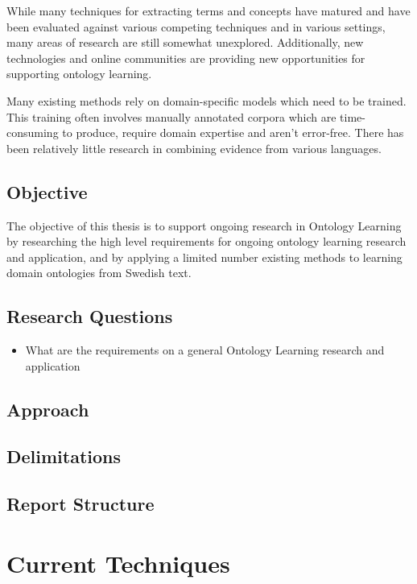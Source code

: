 \documentclass[a4paper]{report}
\begin{document}
While many techniques for extracting terms and concepts have matured and have been evaluated against various competing techniques and in various settings, many areas of research are still somewhat unexplored.
Additionally, new technologies and online communities are providing new opportunities for supporting ontology learning.

Many existing methods rely on domain-specific models which need to be trained.
This training often involves manually annotated corpora which are time-consuming to produce, require domain expertise and aren't error-free.
There has been relatively little research in combining evidence from various languages.

\section{Objective}

The objective of this thesis is to support ongoing research in Ontology Learning by researching the high level requirements for ongoing ontology learning research and application, and by applying a limited number existing methods to learning domain ontologies from Swedish text.
\cite{expand and clarify}

\section{Research Questions}

\begin{itemize}
  \item{What are the requirements on a general Ontology Learning research and application}
\end{itemize}

\section{Approach}

\section{Delimitations}

\section{Report Structure}


\chapter{Current Techniques}
\end{document}
